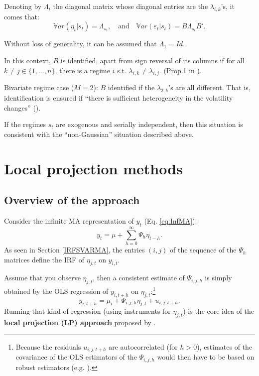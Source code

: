 \documentclass[
  12pt,
]{book}
\theoremstyle{definition}
\theoremstyle{definition}
\theoremstyle{definition}
\theoremstyle{definition}
\theoremstyle{remark}
\begin{document}
Denoting by \(\Lambda_i\) the diagonal matrix whose diagonal entries are the \(\lambda_{i,k}\)'s, it comes that:
\[
\mathbb{V}ar(\eta_{t}|s_t) = \Lambda_{s_t},\quad \mbox{and}\quad \mathbb{V}ar(\varepsilon_{t}|s_t) = B\Lambda_{s_t}B'.
\]

Without loss of generality, it can be assumed that \(\Lambda_1=Id\).

In this context, \(B\) is identified, apart from sign reversal of its columns if for all \(k \ne j \in \{1,\dots,n\}\), there is a regime \(i\) s.t. \(\lambda_{i,k} \ne \lambda_{i,j}\). (Prop.1 in \citet{LANNE2010121}).

Bivariate regime case (\(M=2\)): \(B\) identified if the \(\lambda_{2,k}\)'s are all different. That is, identification is ensured if ``there is sufficient heterogeneity in the volatility changes'' (\citet{LUTKEPOHL20172}).

If the regimes \(s_t\) are exogenous and serially independent, then this situation is consistent with the ``non-Gaussian'' situation described above.

\hypertarget{Projections}{%
\chapter{Local projection methods}\label{Projections}}

\hypertarget{overview-of-the-approach}{%
\section{Overview of the approach}\label{overview-of-the-approach}}

Consider the infinite MA representation of \(y_t\) (Eq. \eqref{eq:InfMA}):
\[
y_t = \mu + \sum_{h=0}^\infty \Psi_{h} \eta_{t-h}.
\]
As seen in Section \ref{IRFSVARMA}, the entries \((i,j)\) of the sequence of the \(\Psi_h\) matrices define the IRF of \(\eta_{j,t}\) on \(y_{i,t}\).

Assume that you observe \(\eta_{j,t}\), then a consistent estimate of \(\Psi_{i,j,h}\) is simply obtained by the OLS regression of \(y_{i,t+h}\) on \(\eta_{j,t}\):\footnote{Because the residuals \(u_{i,j,t+h}\) are autocorrelated (for \(h>0\)), estimates of the covariance of the OLS estimators of the \(\Psi_{i,j,h}\) would then have to be based on robust estimators (e.g. \citet{Newey_West_1987}).}
\begin{equation}
y_{i,t+h} = \mu_i + \Psi_{i,j,h}\eta_{j,t} + u_{i,j,t+h}.\label{eq:OLS1}
\end{equation}
Running that kind of regression (using instruments for \(\eta_{j,t}\)) is the core idea of the \textbf{local projection (LP) approach} proposed by \citet{Jorda_2005}.
\end{document}
